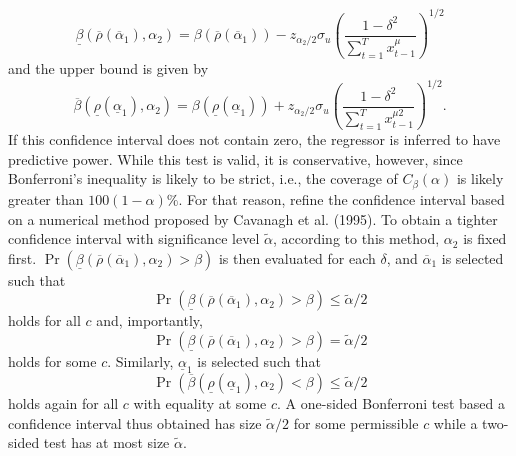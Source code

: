 \documentclass{article}
\begin{document}
\begin{equation}
\underline{\beta}\left(\overline{\rho}\left(\overline{\alpha}_{1}\right), \alpha_{2}\right)=\beta \left(\overline{\rho}\left(\overline{\alpha}_{1}\right) \right)-z_{\alpha_{2} / 2} \sigma_{u}\left(\frac{1-\delta^{2}}{\sum_{t=1}^{T} x_{t-1}^{\mu}}\right)^{1 / 2}
\end{equation}
and the upper bound is given by
\begin{equation}
\overline{\beta}\left(\underline{\rho}\left(\underline{\alpha}_{1}\right), \alpha_{2}\right)=\beta \left(\underline{\rho}\left(\underline{\alpha}_{1}\right) \right)+z_{\alpha_{2} / 2} \sigma_{u}\left(\frac{1-\delta^{2}}{\sum_{t=1}^{T} x_{t-1}^{\mu 2}}\right)^{1 / 2}.
\end{equation}
If this confidence interval does not contain zero, the regressor is inferred to have predictive power. While this test is valid, it is conservative, however, since Bonferroni's inequality is likely to be strict, i.e., the coverage of $C_{\beta}(\alpha)$ is likely greater than $100(1-\alpha) \%$. For that reason, \citet{campbell2006efficient} refine the confidence interval based on a numerical method proposed by Cavanagh et al. (1995). To obtain a tighter confidence interval with significance level $\widetilde{\alpha}$, according to this method, $\alpha_{2}$ is fixed first. $\operatorname{Pr}\left(\underline{\beta}\left(\overline{\rho}\left(\overline{\alpha}_{1}\right), \alpha_{2}\right)>\beta\right)$ is then evaluated for each $\delta$, and $\overline{\alpha}_{1}$ is selected such that 
\begin{equation}
\operatorname{Pr}\left(\underline{\beta}\left(\overline{\rho}\left(\overline{\alpha}_{1}\right),\alpha_{2}\right)>\beta\right) \leq \widetilde{\alpha} / 2\end{equation}
holds for all $c$ and, importantly,
\begin{equation}
\operatorname{Pr}\left(\underline{\beta}\left(\overline{\rho}\left(\overline{\alpha}_{1}\right), \alpha_{2}\right)>\beta\right) = \widetilde{\alpha} / 2
\end{equation}
holds for some $c$. 
Similarly, $\underline{\alpha}_{1}$ is selected such that 
\begin{equation}
\operatorname{Pr}\left(\overline{\beta}\left(\underline{\rho}\left(\underline{\alpha}_{1}\right), \alpha_{2}\right)<\beta\right) \leq \widetilde{\alpha} / 2
\end{equation}
holds again for all $c$ with equality at some $c$. A one-sided Bonferroni test based a confidence interval thus obtained has size $\widetilde{\alpha} / 2$ for some permissible $c$ while a two-sided test has at most size $\widetilde{\alpha}$.  
\end{document}
